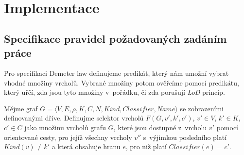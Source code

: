 \chapter{Implementace}






\section{Specifikace pravidel požadovaných zadáním práce}
Pro specifikaci Demeter law definujeme predikát, který nám umožní vybrat vhodné množiny vrcholů. Vybrané množiny potom ověřeíme pomocí predikátu, který uřčí, zda jsou tyto množiny v~pořádku, či zda porušují \emph{LoD} princip.

\begin{definition}
Mějme graf $G = \langle V, E, \rho, K, C, N, \mathit{Kind}, \mathit{Classifier}, \mathit{Name}\rangle$ se zobrazeními definovanými dříve. Definujme selektor vrcholů $F(G, v', k', c')$, $v' \in V$, $k' \in K$, $c' \in C$ jako množinu vrcholů grafu $G$, které jsou dostupné z~vrcholu $v'$ pomocí orientované cesty, pro jejíž všechny vrcholy $v''$ s~výjimkou posledního platí $Kind(v) \ne k'$ a která obsahuje hranu $e$, pro niž platí $Classifier(e) = c' $.
\end{definition}

